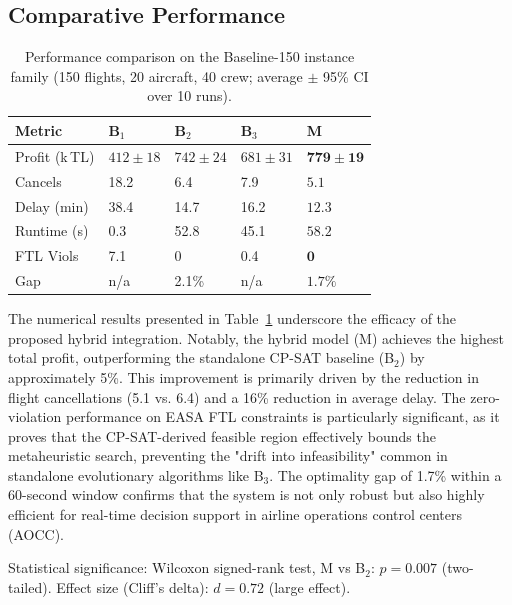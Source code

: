 \documentclass[12pt,number]{elsarticle}
\begin{document}
\subsection{Comparative Performance}
\label{sec:comp_perf}

\begin{table}[H]
\centering
\footnotesize
\caption{Performance comparison on the Baseline-150 instance family (150 flights, 20 aircraft, 40 crew; average $\pm$ 95\% CI over 10 runs).}
\label{tab:results}
\begin{tabular}{@{}p{1.8cm}p{1.5cm}p{1.5cm}p{1.5cm}p{1.5cm}@{}}
\toprule
\textbf{Metric} & \textbf{B$_1$} & \textbf{B$_2$} & \textbf{B$_3$} & \textbf{M} \\
\midrule
Profit (k\,TL) & $412{\pm}18$ & $742{\pm}24$ & $681{\pm}31$ & $\mathbf{779{\pm}19}$ \\
Cancels & 18.2 & 6.4 & 7.9 & $\mathbf{5.1}$ \\
Delay (min) & 38.4 & 14.7 & 16.2 & $\mathbf{12.3}$ \\
Runtime (s) & 0.3 & 52.8 & 45.1 & $\mathbf{58.2}$ \\
FTL Viols & 7.1 & 0 & 0.4 & $\mathbf{0}$ \\
Gap & n/a & 2.1\% & n/a & $\mathbf{1.7\%}$ \\
\bottomrule
\end{tabular}
\end{table}

The numerical results presented in Table~\ref{tab:results} underscore the efficacy of the proposed hybrid integration. Notably, the hybrid model (M) achieves the highest total profit, outperforming the standalone CP-SAT baseline (B$_2$) by approximately 5\%. This improvement is primarily driven by the reduction in flight cancellations (5.1 vs. 6.4) and a 16\% reduction in average delay. The zero-violation performance on EASA FTL constraints is particularly significant, as it proves that the CP-SAT-derived feasible region effectively bounds the metaheuristic search, preventing the "drift into infeasibility" common in standalone evolutionary algorithms like B$_3$. The optimality gap of 1.7\% within a 60-second window confirms that the system is not only robust but also highly efficient for real-time decision support in airline operations control centers (AOCC).

Statistical significance: Wilcoxon signed-rank test, M vs B$_2$: $p = 0.007$ (two-tailed). Effect size (Cliff's delta): $d = 0.72$ (large effect).
\end{document}
